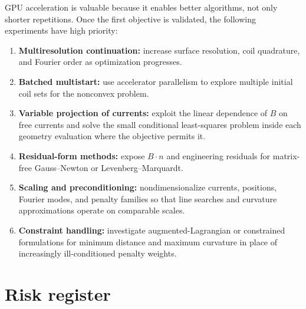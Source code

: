\documentclass[11pt,a4paper]{article}
\begin{document}
GPU acceleration is valuable because it enables better algorithms, not only
shorter repetitions.  Once the first objective is validated, the following
experiments have high priority:
\begin{enumerate}
  \item \textbf{Multiresolution continuation:} increase surface resolution,
        coil quadrature, and Fourier order as optimization progresses.
  \item \textbf{Batched multistart:} use accelerator parallelism to explore
        multiple initial coil sets for the nonconvex problem.
  \item \textbf{Variable projection of currents:} exploit the linear dependence
        of $B$ on free currents and solve the small conditional least-squares
        problem inside each geometry evaluation where the objective permits it.
  \item \textbf{Residual-form methods:} expose $B\cdot n$ and engineering
        residuals for matrix-free Gauss--Newton or Levenberg--Marquardt.
  \item \textbf{Scaling and preconditioning:} nondimensionalize currents,
        positions, Fourier modes, and penalty families so that line searches and
        curvature approximations operate on comparable scales.
  \item \textbf{Constraint handling:} investigate augmented-Lagrangian or
        constrained formulations for minimum distance and maximum curvature in
        place of increasingly ill-conditioned penalty weights.
\end{enumerate}

\section{Risk register}
\end{document}

